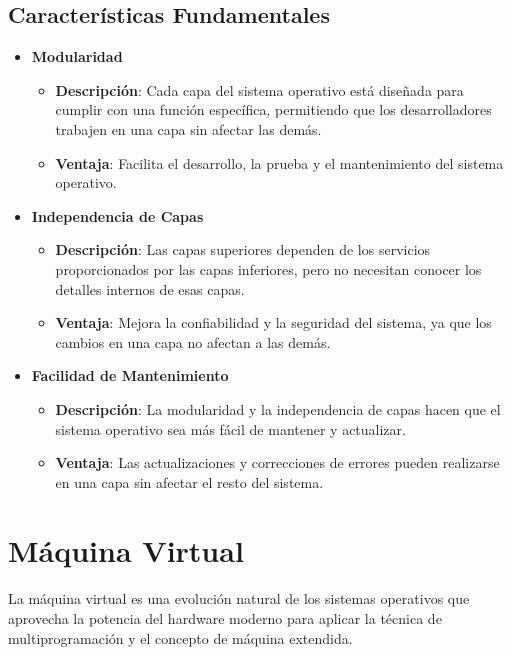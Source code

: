 \subsection{Características Fundamentales}


\begin{itemize}
	\item \textbf{Modularidad}
	\begin{itemize}
		\item \textbf{Descripción}: Cada capa del sistema operativo está diseñada para cumplir con una función específica, permitiendo que los desarrolladores trabajen en una capa sin afectar las demás.
		\item \textbf{Ventaja}: Facilita el desarrollo, la prueba y el mantenimiento del sistema operativo.
	\end{itemize}
	
	\item \textbf{Independencia de Capas}
	\begin{itemize}
		\item \textbf{Descripción}: Las capas superiores dependen de los servicios proporcionados por las capas inferiores, pero no necesitan conocer los detalles internos de esas capas.
		\item \textbf{Ventaja}: Mejora la confiabilidad y la seguridad del sistema, ya que los cambios en una capa no afectan a las demás.
	\end{itemize}
	
	\item \textbf{Facilidad de Mantenimiento}
	\begin{itemize}
		\item \textbf{Descripción}: La modularidad y la independencia de capas hacen que el sistema operativo sea más fácil de mantener y actualizar.
		\item \textbf{Ventaja}: Las actualizaciones y correcciones de errores pueden realizarse en una capa sin afectar el resto del sistema.
	\end{itemize}
\end{itemize}

\section{Máquina Virtual}
La máquina virtual es una evolución natural de los sistemas operativos que aprovecha la potencia del hardware moderno para aplicar la técnica de multiprogramación y el concepto de máquina extendida. 

